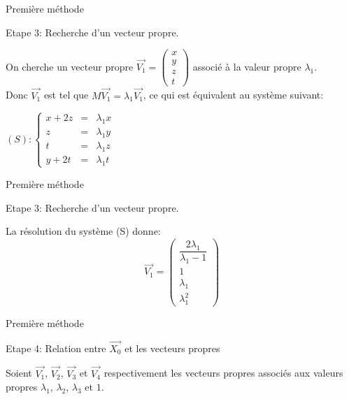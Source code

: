 \documentclass[12pt]{beamer}
\begin{document}
\begin{frame}[t]{Première méthode}
  \begin{block}{Etape 3: Recherche d'un vecteur propre.}
  \end{block}
  On cherche un vecteur propre $\overrightarrow{V_1}=\left( \begin{array}{c}
x \\ 
y \\ 
z \\ 
t
\end{array} \right)$ associé à la valeur propre  $\lambda_1$.\\
 Donc $\overrightarrow{V_1}$ est tel que $M\overrightarrow{V_1}=\lambda_1\overrightarrow{V_1}$, ce qui est équivalent au système suivant:
\begin{center}
$(S): \left\{ \begin{array}{rcl}
x+2z & = & \lambda_1 x \\
z & = & \lambda_1 y \\
t & = & \lambda_1 z \\
y+2t&= & \lambda_1 t
\end{array} $
\end{center}
\end{frame}
\begin{frame}[t]{Première méthode}
  \begin{block}{Etape 3: Recherche d'un vecteur propre.}
  \end{block}
 La résolution du système (S) donne: $$\overrightarrow{V_1}=\left(\begin{array}{c}
\dfrac{2\lambda_1}{\lambda_1-1} \\ 
1 \\ 
 \lambda_1\\ 
\lambda_1^2
\end{array} \right)$$ 
\end{frame}
\begin{frame}[t]{Première méthode}
 \begin{block}{Etape 4: Relation entre $\overrightarrow{X_0}$ et les vecteurs propres }
  \end{block}
  Soient $\overrightarrow{V_1}$, $\overrightarrow{V_2}$, $\overrightarrow{V_3}$ et $\overrightarrow{V_4}$ respectivement les vecteurs propres associés aux valeurs propres $\lambda_1$, $\lambda_2$, $\lambda_3$ et $1$. \\
\end{frame}
\end{document}
